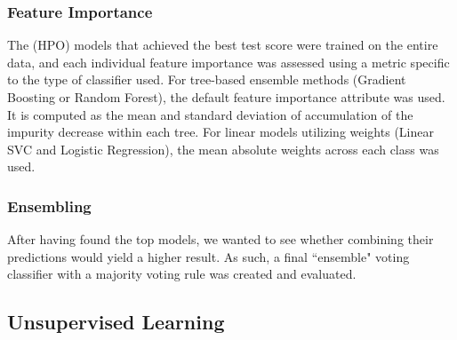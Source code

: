 \documentclass{IEEEtran}
\begin{document}
\subsubsection{Feature Importance}
The (HPO) models that achieved the best test score were trained on the entire data, and each individual feature importance was assessed using a metric specific to the type of classifier used. For tree-based ensemble methods (Gradient Boosting or Random Forest), the default feature importance attribute was used. It is computed as the mean and standard deviation of accumulation of the impurity decrease within each tree. For linear models utilizing weights (Linear SVC and Logistic Regression), the mean absolute weights across each class was used.

\subsubsection{Ensembling}
After having found the top models, we wanted to see whether combining their predictions would yield a higher result. As such, a final ``ensemble" voting classifier with a majority voting rule was created and evaluated.

\subsection{Unsupervised Learning}
\end{document}
